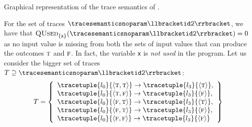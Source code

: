 \begin{example}
\begin{marginfigure}
\caption{Graphical representation of the trace semantics of .}
\end{marginfigure}
For the set of traces $\tracesemanticsnoparam\semanticsof{\texttt{id2}}$, we have that $\qusedname_{\{\texttt{x} \}}(\tracesemanticsnoparam\semanticsof{\texttt{id2}})=0$ as no input value is missing from both the sets of input values that can produce the outcomes $\textsc{t}$ and $\textsc{f}$. In fact, the variable \texttt{x} is \emph{not used} in the program.
Let us consider the bigger set of traces $\defsetoftraces \supseteq \tracesemanticsnoparam\semanticsof{\texttt{id2}}$:
\begin{align*}
  \defsetoftraces
  =
  \left\{
    \begin{array}{l}
      \tracetuple{\locinit}{\langle \true, \true\rangle}\rightarrow\tracetuple{\loc{3}}{\langle \true\rangle}, \\
      \tracetuple{\locinit}{\langle \true, \false\rangle}\rightarrow\tracetuple{\loc{3}}{\langle \false\rangle}, \\
      \tracetuple{\locinit}{\langle \false, \true\rangle}\rightarrow\tracetuple{\loc{3}}{\langle \true\rangle}, \\
      \tracetuple{\locinit}{\langle \false, \true\rangle}\rightarrow\tracetuple{\loc{3}}{\langle \false\rangle}, \\
      \tracetuple{\locinit}{\langle \false, \false\rangle}\rightarrow\tracetuple{\loc{3}}{\langle \false\rangle}
    \end{array}
    \right\}
\end{align*}
\begin{marginfigure}
\end{marginfigure}
\end{example}
